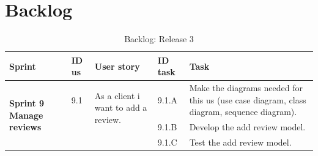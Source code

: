 \documentclass[12pt,a4paper]{report}
\begin{document}
	\section{Backlog}
	\begin{table}[H]
		\begin{center}
			\captionsetup[table]{skip=10pt}
			\caption{Backlog: Release 3}
			\setlength\doublerulesep{0.5pt}
			\begin{tabular}{|  p{3cm}|  p{1cm}| p{4cm}|  p{1cm}| p{6cm}|}
				\hline 
				\rowcolor{LightCyan}
				\textbf{Sprint} & \textbf{ID \ac{us}} & \textbf{User story} & \textbf{ID task} & \textbf{Task} 
				\\
				\hline
				\multirow{5}{3cm}{\textbf{Sprint 9} \textbf{Manage reviews} }
				&                       
				9.1  &  
				\multirow{2}{4cm}{As a client i want to add a review.}
				
				&				                      
				9.1.A &                        
				Make the diagrams needed for this \ac{us} (use case diagram, class diagram, sequence diagram).
				\\ 
				\cline{4-5}    
				&                   
				&                                 
				&                        
				9.1.B &                        
				Develop the add review model.
				\\ 
				\cline{4-5}    
				&                   
				&                                 
				&                        
				9.1.C &                        
				Test the add review model.
				
				
				
				
			\end{tabular}
			
		\end{center}
		
	\end{table}
\end{document}
